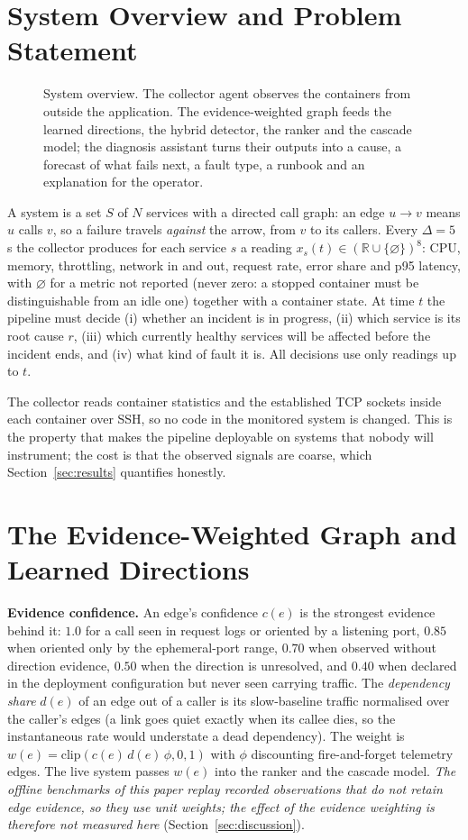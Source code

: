 \documentclass[journal]{IEEEtran}
\begin{document}
\section{System Overview and Problem Statement}
\label{sec:overview}
\begin{figure}[!t]
\centering

\caption{System overview. The collector agent observes the containers from outside the application. The evidence-weighted
graph feeds the learned directions, the hybrid detector, the ranker and the cascade model; the diagnosis assistant turns their
outputs into a cause, a forecast of what fails next, a fault type, a runbook and an explanation for the operator.}
\label{fig:arch}
\end{figure}

A system is a set $S$ of $N$ services with a directed call graph: an edge $u\!\to\!v$ means $u$ calls $v$, so a failure travels
\emph{against} the arrow, from $v$ to its callers. Every $\Delta=5$\,s the collector produces for each service $s$ a reading
$x_s(t)\in(\mathbb{R}\cup\{\varnothing\})^8$: CPU, memory, throttling, network in and out, request rate, error share and p95 latency,
with $\varnothing$ for a metric not reported (never zero: a stopped container must be distinguishable from an idle one) together
with a container state. At time $t$ the pipeline must decide (i) whether an incident is in progress, (ii) which service is its root
cause $r$, (iii) which currently healthy services will be affected before the incident ends, and (iv) what kind of fault it is.
All decisions use only readings up to $t$.

The collector reads container statistics and the established TCP sockets inside each container over SSH, so no code in the
monitored system is changed. This is the property that makes the pipeline deployable on systems that nobody will instrument; the
cost is that the observed signals are coarse, which Section~\ref{sec:results} quantifies honestly.

\section{The Evidence-Weighted Graph and Learned Directions}
\label{sec:graph}
\textbf{Evidence confidence.} An edge's confidence $c(e)$ is the strongest evidence behind it: $1.0$ for a call seen in request
logs or oriented by a listening port, $0.85$ when oriented only by the ephemeral-port range, $0.70$ when observed without
direction evidence, $0.50$ when the direction is unresolved, and $0.40$ when declared in the deployment configuration but never seen
carrying traffic. The \emph{dependency share} $d(e)$ of an edge out of a caller is its slow-baseline traffic normalised over the
caller's edges (a link goes quiet exactly when its callee dies, so the instantaneous rate would understate a dead dependency). The
weight is $w(e)=\mathrm{clip}(c(e)\,d(e)\,\phi,0,1)$ with $\phi$ discounting fire-and-forget telemetry edges. The live system
passes $w(e)$ into the ranker and the cascade model. \emph{The offline benchmarks of this paper replay recorded observations that
do not retain edge evidence, so they use unit weights; the effect of the evidence weighting is therefore not measured here} (Section~\ref{sec:discussion}).
\end{document}
